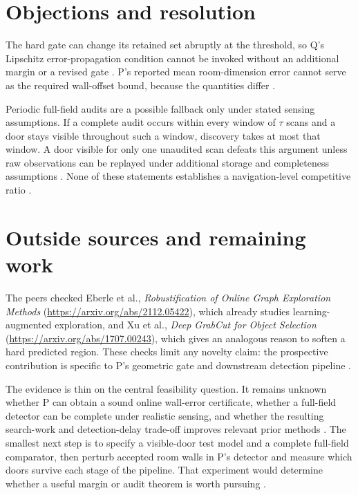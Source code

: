 \documentclass{article}
\begin{document}
\section*{Objections and resolution}

The hard gate can change its retained set abruptly at the threshold, so Q's Lipschitz error-propagation condition cannot be invoked without an additional margin or a revised gate . P's reported mean room-dimension error cannot serve as the required wall-offset bound, because the quantities differ .

Periodic full-field audits are a possible fallback only under stated sensing assumptions. If a complete audit occurs within every window of \(\tau\) scans and a door stays visible throughout such a window, discovery takes at most that window. A door visible for only one unaudited scan defeats this argument unless raw observations can be replayed under additional storage and completeness assumptions . None of these statements establishes a navigation-level competitive ratio .

\section*{Outside sources and remaining work}

The peers checked Eberle et al., \emph{Robustification of Online Graph Exploration Methods} (\url{https://arxiv.org/abs/2112.05422}), which already studies learning-augmented exploration, and Xu et al., \emph{Deep GrabCut for Object Selection} (\url{https://arxiv.org/abs/1707.00243}), which gives an analogous reason to soften a hard predicted region. These checks limit any novelty claim: the prospective contribution is specific to P's geometric gate and downstream detection pipeline .

The evidence is thin on the central feasibility question. It remains unknown whether P can obtain a sound online wall-error certificate, whether a full-field detector can be complete under realistic sensing, and whether the resulting search-work and detection-delay trade-off improves relevant prior methods . The smallest next step is to specify a visible-door test model and a complete full-field comparator, then perturb accepted room walls in P's detector and measure which doors survive each stage of the pipeline. That experiment would determine whether a useful margin or audit theorem is worth pursuing .
\end{document}
